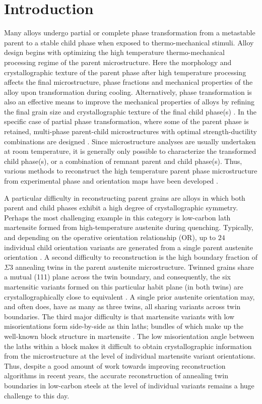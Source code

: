 \documentclass{elsarticle}
\numberwithin{equation}{section}
\begin{document}
\section{Introduction}
Many alloys undergo partial or complete phase transformation from a metastable parent to a stable child phase when exposed to thermo-mechanical stimuli. Alloy design begins with optimizing the high temperature thermo-mechanical processing regime of the parent microstructure. Here the morphology and crystallographic texture of the parent phase after high temperature processing affects the final microstructure, phase fractions and mechanical properties of the alloy upon transformation during cooling. Alternatively, phase transformation is also an effective means to improve the mechanical properties of alloys by refining the final grain size and crystallographic texture of the final child phase(s) \cite{Niessen2021a,Kundu2007}. In the specific case of partial phase transformation, where some of the parent phase is retained, multi-phase parent-child microstructures with optimal strength-ductility combinations are designed \cite{Edmonds2006}.  Since microstructure analyses are usually undertaken at room temperature, it is generally only possible to characterize the transformed child phase(s), or a combination of remnant parent and child phase(s). Thus, various methods to reconstruct the high temperature parent phase microstructure from experimental phase and orientation maps have been developed \cite{Cayron2006,Miyamoto2010,Germain2012,Niessen2021b}.

A particular difficulty in reconstructing parent grains are alloys in which both parent and child phases exhibit a high degree of crystallographic symmetry. Perhaps the most challenging example in this category is low-carbon lath martensite formed from high-temperature austenite during quenching. Typically, and depending on the operative orientation relationship (OR), up to $24$ individual child orientation variants are generated from a single parent austenite orientation \cite{Nyyssonen2016}. A second difficulty to reconstruction is the high boundary fraction of $\Sigma$3 annealing twins in the parent austenite microstructure. Twinned grains share a mutual (111) plane across the twin boundary, and consequently, the six martensitic variants formed on this particular habit plane (in both twins) are crystallographically close to equivalent \cite{Miyamoto2010}. A single prior austenite orientation may, and often does, have as many as three twins, all sharing variants across twin boundaries. The third major difficulty is that martensite variants with low misorientations form side-by-side as thin laths; bundles of which make up the well-known block structure in martensite \cite{Morito2003}. The low misorientation angle between the laths within a block makes it difficult to obtain crystallographic information from the microstructure at the level of individual martensite variant orientations. Thus, despite a good amount of work towards improving reconstruction algorithms in recent years, the accurate reconstruction of annealing twin boundaries in low-carbon steels at the level of individual variants remains a huge challenge to this day.
\end{document}
